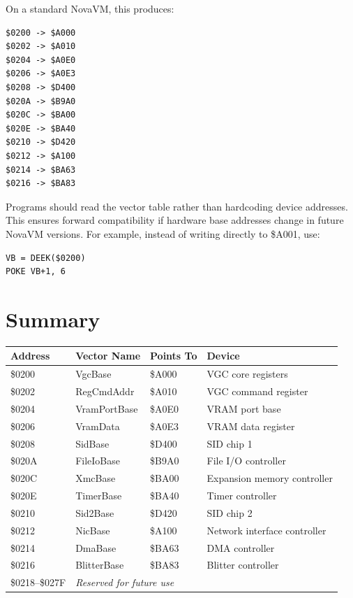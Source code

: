 On a standard NovaVM, this produces:

\begin{lstlisting}
$0200 -> $A000
$0202 -> $A010
$0204 -> $A0E0
$0206 -> $A0E3
$0208 -> $D400
$020A -> $B9A0
$020C -> $BA00
$020E -> $BA40
$0210 -> $D420
$0212 -> $A100
$0214 -> $BA63
$0216 -> $BA83
\end{lstlisting}

\begin{notebox}
Programs should read the vector table rather than hardcoding device addresses.
This ensures forward compatibility if hardware base addresses change in future
NovaVM versions.  For example, instead of writing directly to \$A001, use:
\begin{lstlisting}
VB = DEEK($0200)
POKE VB+1, 6
\end{lstlisting}
\end{notebox}

\section*{Summary}

\begin{center}
\small
\begin{tabular}{@{}llll@{}}
\toprule
\textbf{Address} & \textbf{Vector Name} & \textbf{Points To} & \textbf{Device} \\
\midrule
\$0200 & VgcBase      & \$A000 & VGC core registers \\
\$0202 & RegCmdAddr   & \$A010 & VGC command register \\
\$0204 & VramPortBase & \$A0E0 & VRAM port base \\
\$0206 & VramData     & \$A0E3 & VRAM data register \\
\$0208 & SidBase      & \$D400 & SID chip 1 \\
\$020A & FileIoBase   & \$B9A0 & File I/O controller \\
\$020C & XmcBase      & \$BA00 & Expansion memory controller \\
\$020E & TimerBase    & \$BA40 & Timer controller \\
\$0210 & Sid2Base     & \$D420 & SID chip 2 \\
\$0212 & NicBase      & \$A100 & Network interface controller \\
\$0214 & DmaBase      & \$BA63 & DMA controller \\
\$0216 & BlitterBase  & \$BA83 & Blitter controller \\
\midrule
\$0218--\$027F & \multicolumn{3}{l}{\textit{Reserved for future use}} \\
\bottomrule
\end{tabular}
\end{center}
